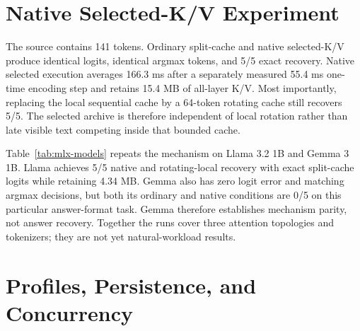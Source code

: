 \documentclass[10pt]{article}
\begin{document}
\section{Native Selected-K/V Experiment}
\begin{table}[t]
\centering
\small
\caption{Five-seed native selected-K/V control. Latency excludes the separately
reported one-time native encoding cost. Native MB is all-layer selected K/V.}

\label{tab:mlx-native}
\end{table}

The source contains 141 tokens. Ordinary split-cache and native selected-K/V
produce identical logits, identical argmax tokens, and 5/5 exact recovery.
Native selected execution averages 166.3 ms after a separately measured 55.4
ms one-time encoding step and retains 15.4 MB of all-layer K/V. Most
importantly, replacing the local sequential cache by a 64-token rotating cache
still recovers 5/5. The selected archive is therefore independent of local
rotation rather than late visible text competing inside that bounded cache.

\begin{table}[t]
\centering
\small
\caption{Cross-model native selected-K/V replication. Native and rotating
columns report exact recovery over five seeds; error is zero for every row.}

\label{tab:mlx-models}
\end{table}

Table~\ref{tab:mlx-models} repeats the mechanism on Llama 3.2 1B and Gemma 3
1B. Llama achieves 5/5 native and rotating-local recovery with exact
split-cache logits while retaining 4.34 MB. Gemma also has zero logit error and
matching argmax decisions, but both its ordinary and native conditions are 0/5
on this particular answer-format task. Gemma therefore establishes mechanism
parity, not answer recovery. Together the runs cover three attention
topologies and tokenizers; they are not yet natural-workload results.

\section{Profiles, Persistence, and Concurrency}
\begin{table}[H]
\centering
\small
\caption{Five-seed consumer-layer sweep. Active MB counts selected native K/V,
not model weights or request-local K/V.}

\label{tab:mlx-profiles}
\end{table}
\end{document}
